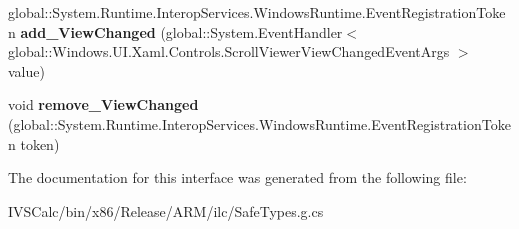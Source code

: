\begin{DoxyCompactItemize}
global\+::\+System.\+Runtime.\+Interop\+Services.\+Windows\+Runtime.\+Event\+Registration\+Token {\bfseries add\+\_\+\+View\+Changed} (global\+::\+System.\+Event\+Handler$<$ global\+::\+Windows.\+U\+I.\+Xaml.\+Controls.\+Scroll\+Viewer\+View\+Changed\+Event\+Args $>$ value)
\item 
\mbox{\label{interface_windows_1_1_u_i_1_1_xaml_1_1_controls_1_1_i_scroll_viewer_a3176001cb06e45e61bbee6a898c4c7b3}} 
void {\bfseries remove\+\_\+\+View\+Changed} (global\+::\+System.\+Runtime.\+Interop\+Services.\+Windows\+Runtime.\+Event\+Registration\+Token token)
\end{DoxyCompactItemize}


The documentation for this interface was generated from the following file\+:\begin{DoxyCompactItemize}
\item 
I\+V\+S\+Calc/bin/x86/\+Release/\+A\+R\+M/ilc/Safe\+Types.\+g.\+cs\end{DoxyCompactItemize}
